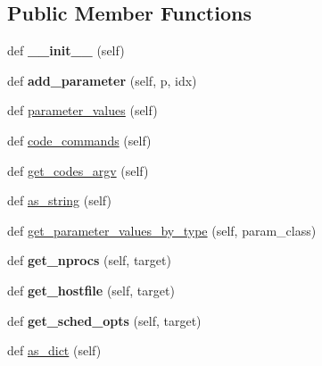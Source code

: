 \subsection*{Public Member Functions}
\begin{DoxyCompactItemize}
\item 
\mbox{\label{classcodar_1_1cheetah_1_1parameters_1_1_instance_abc52192d373d1741efd7566d320d68c1}} 
def {\bfseries \+\_\+\+\_\+init\+\_\+\+\_\+} (self)
\item 
\mbox{\label{classcodar_1_1cheetah_1_1parameters_1_1_instance_a600511535b03f1796f9a0d84b654e113}} 
def {\bfseries add\+\_\+parameter} (self, p, idx)
\item 
def \hyperlink{classcodar_1_1cheetah_1_1parameters_1_1_instance_a4a943c0f5f3afe8b9a4ff9b238aab766}{parameter\+\_\+values} (self)
\item 
def \hyperlink{classcodar_1_1cheetah_1_1parameters_1_1_instance_a417d9d44a5eb0e0b8812fc427ddc4435}{code\+\_\+commands} (self)
\item 
def \hyperlink{classcodar_1_1cheetah_1_1parameters_1_1_instance_a4ee126bbceeb792914185ca9fbe59101}{get\+\_\+codes\+\_\+argv} (self)
\item 
def \hyperlink{classcodar_1_1cheetah_1_1parameters_1_1_instance_a053717fc3ee7840a7c32173f15e99ae3}{as\+\_\+string} (self)
\item 
def \hyperlink{classcodar_1_1cheetah_1_1parameters_1_1_instance_ab1187231851e554aa1e95f7e7eee7b77}{get\+\_\+parameter\+\_\+values\+\_\+by\+\_\+type} (self, param\+\_\+class)
\item 
\mbox{\label{classcodar_1_1cheetah_1_1parameters_1_1_instance_add69b3c4bcc37530ba16bd77cd843872}} 
def {\bfseries get\+\_\+nprocs} (self, target)
\item 
\mbox{\label{classcodar_1_1cheetah_1_1parameters_1_1_instance_a54136234ef868666b93d88f6be0117ff}} 
def {\bfseries get\+\_\+hostfile} (self, target)
\item 
\mbox{\label{classcodar_1_1cheetah_1_1parameters_1_1_instance_a584b71500e5f5ef6bec6d6f2f6bb95ae}} 
def {\bfseries get\+\_\+sched\+\_\+opts} (self, target)
\item 
def \hyperlink{classcodar_1_1cheetah_1_1parameters_1_1_instance_ae978374d4b5e01c2764b9513ae38a961}{as\+\_\+dict} (self)
\end{DoxyCompactItemize}


